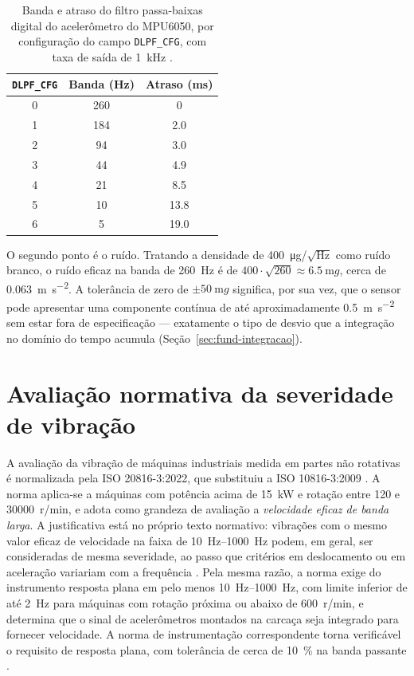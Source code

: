 \begin{table}[!htb]
\centering
\caption{Banda e atraso do filtro passa-baixas digital do acelerômetro do MPU6050, por
configuração do campo \texttt{DLPF\_CFG}, com taxa de saída de \SI{1}{\kilo\hertz}
\cite{invensense2012rm}.}
\label{tab:fund-dlpf}
\small
\begin{tabular}{@{}ccc@{}}
\toprule
\texttt{DLPF\_CFG} & Banda (\si{\hertz}) & Atraso (\si{\milli\second}) \\
\midrule
0 & 260 & \num{0}    \\
1 & 184 & \num{2,0}  \\
2 & 94  & \num{3,0}  \\
3 & 44  & \num{4,9}  \\
4 & 21  & \num{8,5}  \\
5 & 10  & \num{13,8} \\
6 & 5   & \num{19,0} \\
\bottomrule
\end{tabular}
\end{table}

O segundo ponto é o ruído. Tratando a densidade de \SI{400}{\micro g}/$\sqrt{\si{\hertz}}$
como ruído branco, o ruído eficaz na banda de \SI{260}{\hertz} é de
$400 \cdot \sqrt{260} \approx \SI{6,5}{\milli g}$, cerca de
\SI{0,063}{\meter\per\second\squared}. A tolerância de zero de $\pm\SI{50}{\milli g}$
significa, por sua vez, que o sensor pode apresentar uma componente contínua de até
aproximadamente \SI{0,5}{\meter\per\second\squared} sem estar fora de especificação ---
exatamente o tipo de desvio que a integração no domínio do tempo acumula
(Seção~\ref{sec:fund-integracao}).

\section{Avaliação normativa da severidade de vibração}
\label{sec:fund-norma}

A avaliação da vibração de máquinas industriais medida em partes não rotativas é
normalizada pela ISO 20816-3:2022, que substituiu a ISO 10816-3:2009
\cite{iso208163_2022,iso108163_2009}. A norma aplica-se a máquinas com potência acima de
\SI{15}{\kilo\watt} e rotação entre \num{120} e \num{30000}~r/min, e adota como grandeza de
avaliação a \emph{velocidade eficaz de banda larga}. A justificativa está no próprio texto
normativo: vibrações com o mesmo valor eficaz de velocidade na faixa de \SIrange{10}{1000}{\hertz}
podem, em geral, ser consideradas de mesma severidade, ao passo que critérios em
deslocamento ou em aceleração variariam com a frequência \cite{iso208163_2022}. Pela mesma
razão, a norma exige do instrumento resposta plana em pelo menos
\SIrange{10}{1000}{\hertz}, com limite inferior de até \SI{2}{\hertz} para máquinas com
rotação próxima ou abaixo de \num{600}~r/min, e determina que o sinal de acelerômetros
montados na carcaça seja integrado para fornecer velocidade. A norma de instrumentação
correspondente torna verificável o requisito de resposta plana, com tolerância de cerca de
\SI{10}{\percent} na banda passante \cite{iso2954_2012}.

